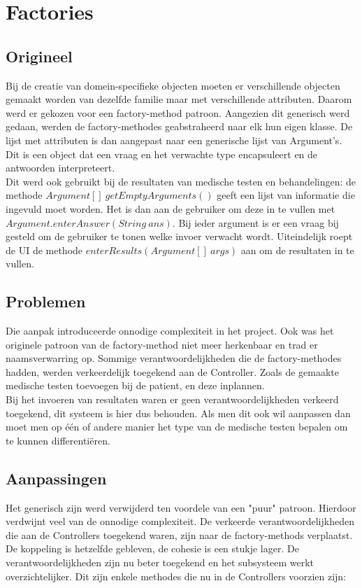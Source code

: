 \section{Factories\label{Factory}}
\subsection{Origineel}
Bij de creatie van domein-specifieke objecten moeten er verschillende objecten gemaakt worden van dezelfde familie maar met verschillende attributen. 
Daarom werd er gekozen voor een factory-method patroon. 
Aangezien dit generisch werd gedaan, werden de factory-methodes geabstraheerd naar elk hun eigen klasse. 
De lijst met attributen is dan aangepast naar een generische lijst van Argument's. 
Dit is een object dat een vraag en het verwachte type encapsuleert en de antwoorden interpreteert.\\

Dit werd ook gebruikt bij de resultaten van medische testen en behandelingen: 
de methode $Argument[]\ getEmptyArguments()$ geeft een lijst van informatie die ingevuld moet worden.
Het is dan aan de gebruiker om deze in te vullen met $Argument.enterAnswer(String\ ans)$. 
Bij ieder argument is er een vraag bij gesteld om de gebruiker te tonen welke invoer verwacht wordt. 
Uiteindelijk roept de UI de methode $enterResults(Argument[]\ args)$ aan om de resultaten in te vullen. 

\subsection{Problemen}
Die aanpak introduceerde onnodige complexiteit in het project. 
Ook was het originele patroon van de factory-method niet meer herkenbaar en trad er naamsverwarring op. 
Sommige verantwoordelijkheden die de factory-methodes hadden, werden verkeerdelijk toegekend aan de Controller. 
Zoals de gemaakte medische testen toevoegen bij de patient, en deze inplannen. \\

Bij het invoeren van resultaten waren er geen verantwoordelijkheden verkeerd toegekend, dit systeem is hier dus behouden. 
Als men dit ook wil aanpassen dan moet men op één of andere manier het type van de medische testen bepalen om te kunnen differentiëren. 

\subsection{Aanpassingen}
Het generisch zijn werd verwijderd ten voordele van een "puur" patroon. 
Hierdoor verdwijnt veel van de onnodige complexiteit.
De verkeerde verantwoordelijkheden die aan de Controllers toegekend waren, zijn naar de factory-methods verplaatst.
De koppeling is hetzelfde gebleven, de cohesie is een stukje lager. 
De verantwoordelijkheden zijn nu beter toegekend en het subsysteem werkt overzichtelijker. 
Dit zijn enkele methodes die nu in de Controllers voorzien zijn:

